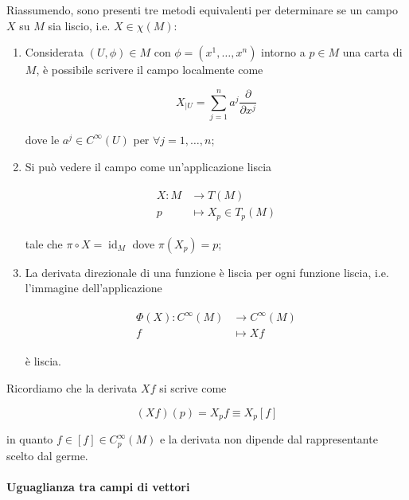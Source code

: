 Riassumendo, sono presenti tre metodi equivalenti per determinare se un campo $ X $ su $ M $ sia liscio, i.e. $ X \in \chi(M) $:

\begin{enumerate}
	\item Considerata $ (U,\phi) \in M $ con $ \phi = (x^{1},\dots,x^{n}) $ intorno a $ p \in M $ una carta di $ M $, è possibile scrivere il campo localmente come
	
	\begin{equation}
		X_{|U} = \sum_{j=1}^{n} a^{j} \dfrac{\partial}{\partial x^{j}}
	\end{equation}

	dove le $ a^{j} \in C^{\infty}(U) $ per $ \forall j=1,\dots,n $;
	
	\item Si può vedere il campo come un'applicazione liscia
	
	\begin{align}
		\begin{split}
			X : M &\to T(M)\\
			p &\mapsto X_{p} \in T_{p}(M)
		\end{split}
	\end{align}
	
	tale che $ \pi \circ X = \operatorname{id}_{M} $ dove $ \pi(X_{p})=p $;
	
	\item La derivata direzionale di una funzione è liscia per ogni funzione liscia, i.e. l'immagine dell'applicazione
	
	\begin{align}
		\begin{split}
			\Phi(X) : C^{\infty}(M) &\to C^{\infty}(M)\\
			f &\mapsto X f
		\end{split}
	\end{align}

	è liscia.
\end{enumerate}

Ricordiamo che la derivata $ X f $ si scrive come

\begin{equation}
	(X f)(p) = X_{p} f \equiv X_{p} [f]
\end{equation}

in quanto $ f \in [f] \in C_{p}^{\infty}(M) $ e la derivata non dipende dal rappresentante scelto dal germe.

\paragraph{Uguaglianza tra campi di vettori}

